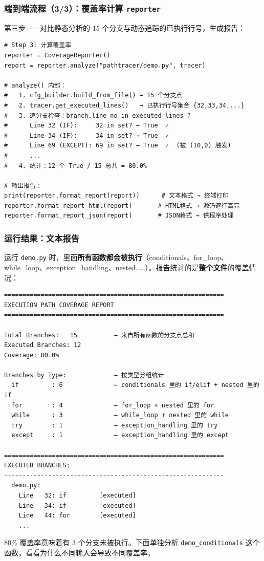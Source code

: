 \documentclass[presentation,aspectratio=169]{ctexbeamer}
\begin{document}

\begin{frame}[fragile]
\frametitle{端到端流程（3/3）：覆盖率计算 \texttt{reporter}}
{\scriptsize 第三步——对比静态分析的 15 个分支与动态追踪的已执行行号，生成报告：}

\vspace{0.05cm}
{\tiny
\begin{verbatim}
# Step 3: 计算覆盖率
reporter = CoverageReporter()
report = reporter.analyze("pathtracer/demo.py", tracer)

# analyze() 内部：
#   1. cfg_builder.build_from_file() → 15 个分支点
#   2. tracer.get_executed_lines()   → 已执行行号集合 {32,33,34,...}
#   3. 逐分支检查：branch.line_no in executed_lines ?
#      Line 32 (IF):     32 in set? → True  ✓
#      Line 34 (IF):     34 in set? → True  ✓
#      Line 69 (EXCEPT): 69 in set? → True  ✓  (被 (10,0) 触发)
#      ...
#   4. 统计：12 个 True / 15 总共 = 80.0%

# 输出报告：
print(reporter.format_report(report))      # 文本格式 → 终端打印
reporter.format_report_html(report)       # HTML格式 → 源码逐行高亮
reporter.format_report_json(report)       # JSON格式 → 供程序处理
\end{verbatim}}
\end{frame}


\begin{frame}[fragile]
\frametitle{运行结果：文本报告}
{\footnotesize 运行 \texttt{demo.py} 时，里面\textbf{所有函数都会被执行}（conditionals、for\_loop、while\_loop、exception\_handling、nested……）。报告统计的是\textbf{整个文件}的覆盖情况：}

\vspace{0.05cm}
{\tiny
\begin{verbatim}
============================================================
EXECUTION PATH COVERAGE REPORT
============================================================

Total Branches:   15          ← 来自所有函数的分支点总和
Executed Branches: 12
Coverage: 80.0%

Branches by Type:             ← 按类型分组统计
  if         : 6              ← conditionals 里的 if/elif + nested 里的 if
  for        : 4              ← for_loop + nested 里的 for
  while      : 3              ← while_loop + nested 里的 while
  try        : 1              ← exception_handling 里的 try
  except     : 1              ← exception_handling 里的 except

============================================================
EXECUTED BRANCHES:
------------------------------------------------------------
  demo.py:
    Line   32: if         [executed]
    Line   34: if         [executed]
    Line   44: for        [executed]
    ...
\end{verbatim}}

\vspace{0.05cm}
{\footnotesize 80\% 覆盖率意味着有 3 个分支未被执行。下面单独分析 \texttt{demo\_conditionals} 这个函数，看看为什么不同输入会导致不同覆盖率。}
\end{frame}
\end{document}
